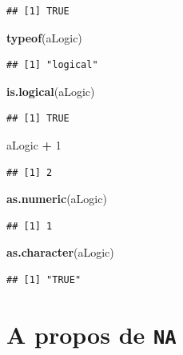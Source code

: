 \documentclass[]{book}
\newenvironment{Shaded}{\begin{snugshade}}{\end{snugshade}}
\newcommand{\KeywordTok}[1]{\textcolor[rgb]{0.13,0.29,0.53}{\textbf{#1}}}
\newcommand{\DecValTok}[1]{\textcolor[rgb]{0.00,0.00,0.81}{#1}}
\newcommand{\StringTok}[1]{\textcolor[rgb]{0.31,0.60,0.02}{#1}}
\newcommand{\OperatorTok}[1]{\textcolor[rgb]{0.81,0.36,0.00}{\textbf{#1}}}
\newcommand{\NormalTok}[1]{#1}
\begin{document}
\begin{verbatim}
## [1] TRUE
\end{verbatim}

\begin{Shaded}
\begin{Highlighting}[]
\KeywordTok{typeof}\NormalTok{(aLogic)}
\end{Highlighting}
\end{Shaded}

\begin{verbatim}
## [1] "logical"
\end{verbatim}

\begin{Shaded}
\begin{Highlighting}[]
\KeywordTok{is.logical}\NormalTok{(aLogic)}
\end{Highlighting}
\end{Shaded}

\begin{verbatim}
## [1] TRUE
\end{verbatim}

\begin{Shaded}
\begin{Highlighting}[]
\NormalTok{aLogic }\OperatorTok{+}\StringTok{ }\DecValTok{1}
\end{Highlighting}
\end{Shaded}

\begin{verbatim}
## [1] 2
\end{verbatim}

\begin{Shaded}
\begin{Highlighting}[]
\KeywordTok{as.numeric}\NormalTok{(aLogic)}
\end{Highlighting}
\end{Shaded}

\begin{verbatim}
## [1] 1
\end{verbatim}

\begin{Shaded}
\begin{Highlighting}[]
\KeywordTok{as.character}\NormalTok{(aLogic)}
\end{Highlighting}
\end{Shaded}

\begin{verbatim}
## [1] "TRUE"
\end{verbatim}

\section{\texorpdfstring{A propos de
\texttt{NA}}{A propos de NA}}\label{a-propos-de-na}
\end{document}
